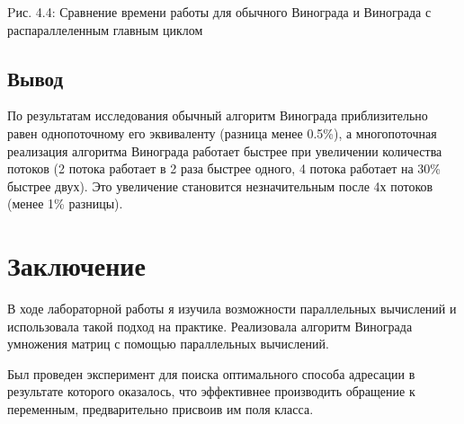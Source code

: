 \documentclass[12pt]{report}
\begin{document}
\begin{center}
Pис. 4.4: Сравнение времени работы для обычного Винограда и Винограда с распараллеленным главным циклом
\end{center}


\section{Вывод}
По результатам исследования обычный алгоритм Винограда приблизительно равен однопоточному его эквиваленту (разница менее 0.5\%), а многопоточная реализация алгоритма Винограда работает быстрее при увеличении количества потоков (2 потока работает в 2 раза быстрее одного, 4 потока работает на 30\% быстрее двух). Это увеличение становится незначительным после 4х потоков (менее 1\% разницы).

\chapter*{Заключение}
В ходе лабораторной работы я изучила возможности параллельных вычислений и использовала такой подход на практике. Реализовала алгоритм Винограда умножения матриц
с помощью параллельных вычислений.

Был проведен эксперимент для поиска оптимального способа адресации в результате которого оказалось, что эффективнее производить обращение к переменным, предварительно присвоив им поля класса.
\end{document}
